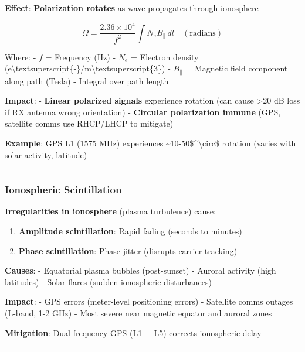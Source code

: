 \textbf{Effect}: \textbf{Polarization rotates} as wave propagates
through ionosphere

\[
\Omega = \frac{2.36 \times 10^4}{f^2} \int N_e B_\parallel \, dl \quad (\text{radians})
\]

Where: - \(f\) = Frequency (Hz) - \(N_e\) = Electron density
(e\textbackslash textsuperscript\{-\}/m\textbackslash textsuperscript\{3\})
- \(B_\parallel\) = Magnetic field component along path (Tesla) -
Integral over path length

\textbf{Impact}: - \textbf{Linear polarized signals} experience rotation
(can cause \textgreater20 dB loss if RX antenna wrong orientation) -
\textbf{Circular polarization immune} (GPS, satellite comms use
RHCP/LHCP to mitigate)

\textbf{Example}: GPS L1 (1575 MHz) experiences
\textasciitilde10-50\$\^{}\textbackslash circ\$ rotation (varies with
solar activity, latitude)

\begin{center}\rule{0.5\linewidth}{0.5pt}\end{center}

\subsubsection{Ionospheric
Scintillation}\label{ionospheric-scintillation}

\textbf{Irregularities in ionosphere} (plasma turbulence) cause:

\begin{enumerate}
\def\labelenumi{\arabic{enumi}.}
\tightlist
\item
  \textbf{Amplitude scintillation}: Rapid fading (seconds to minutes)
\item
  \textbf{Phase scintillation}: Phase jitter (disrupts carrier tracking)
\end{enumerate}

\textbf{Causes}: - Equatorial plasma bubbles (post-sunset) - Auroral
activity (high latitudes) - Solar flares (sudden ionospheric
disturbances)

\textbf{Impact}: - GPS errors (meter-level positioning errors) -
Satellite comms outages (L-band, 1-2 GHz) - Most severe near magnetic
equator and auroral zones

\textbf{Mitigation}: Dual-frequency GPS (L1 + L5) corrects ionospheric
delay

\begin{center}\rule{0.5\linewidth}{0.5pt}\end{center}

